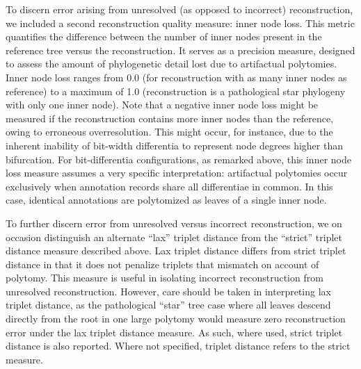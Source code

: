 To discern error arising from unresolved (as opposed to incorrect) reconstruction, we included a second reconstruction quality measure: inner node loss.
This metric quantifies the difference between the number of inner nodes present in the reference tree versus the reconstruction.
It serves as a precision measure, designed to assess the amount of phylogenetic detail lost due to artifactual polytomies.
Inner node loss ranges from 0.0 (for reconstruction with as many inner nodes as reference) to a maximum of 1.0 (reconstruction is a pathological star phylogeny with only one inner node).
Note that a negative inner node loss might be measured if the reconstruction contains more inner nodes than the reference, owing to erroneous overresolution.
This might occur, for instance, due to the inherent inability of bit-width differentia to represent node degrees higher than bifurcation.
For bit-differentia configurations, as remarked above, this inner node loss measure assumes a very specific interpretation: artifactual polytomies occur exclusively when annotation records share all differentiae in common.
In this case, identical annotations are polytomized as leaves of a single inner node.

To further discern error from unresolved versus incorrect reconstruction, we on occasion distinguish an alternate ``lax'' triplet distance from the ``strict'' triplet distance measure described above.
Lax triplet distance differs from strict triplet distance in that it does not penalize triplets that mismatch on account of polytomy.
This measure is useful in isolating incorrect reconstruction from unresolved reconstruction.
However, care should be taken in interpreting lax triplet distance, as the pathological ``star'' tree case where all leaves descend directly from the root in one large polytomy would measure zero reconstruction error under the lax triplet distance measure.
As such, where used, strict triplet distance is also reported.
Where not specified, triplet distance refers to the strict measure.



